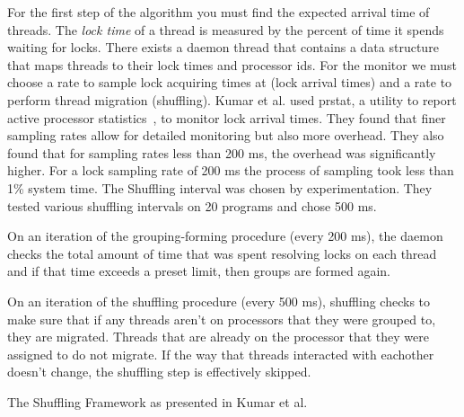 \documentclass{sig-alternate}
\begin{document}
For the first step of the algorithm you must find the expected arrival time of threads. The \textit{lock time} of a thread is measured by the percent of time it spends waiting for locks. There exists a daemon thread that contains a data structure that maps threads to their lock times and processor ids. For the monitor we must choose a rate to sample lock acquiring times at (lock arrival times) and a rate to perform thread migration (shuffling). Kumar et al. used prstat, a utility to report active processor statistics~\cite{prstat}, to monitor lock arrival times. They found that finer sampling rates allow for detailed monitoring but also more overhead. They also found that for sampling rates less than 200 ms, the overhead was significantly higher. For a lock sampling rate of 200 ms the process of sampling took less than 1\% system time. The Shuffling interval was chosen by experimentation. They tested various shuffling intervals on 20 programs and chose 500 ms.

On an iteration of the grouping-forming procedure (every 200 ms), the daemon checks the total amount of time that was spent resolving locks on each thread and if that time exceeds a preset limit, then groups are formed again.

On an iteration of the shuffling procedure (every 500 ms), shuffling checks to make sure that if any threads aren't on processors that they were grouped to, they are migrated. Threads that are already on the processor that they were assigned to do not migrate. If the way that threads interacted with eachother doesn't change, the shuffling step is effectively skipped.~\cite{KumarEtal:2014}

\begin{algorithm}


	\caption{The Shuffling Framework
	as presented in Kumar et al.}\label{euclid}\label{alg:shuffler}
\end{algorithm}
\end{document}
